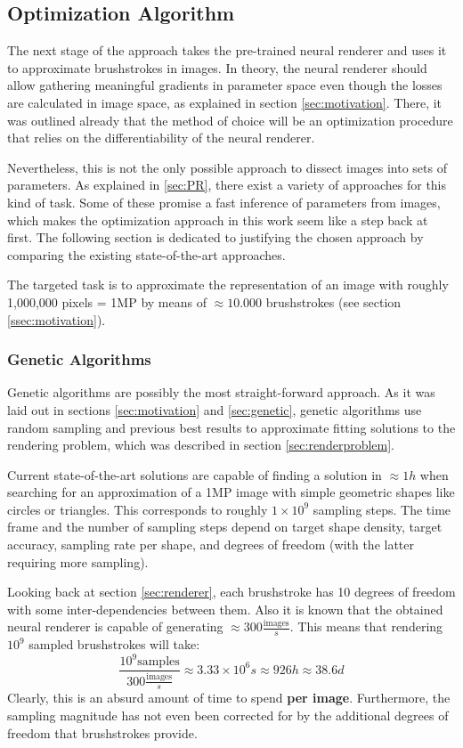 \subsection{Optimization Algorithm}
The next stage of the approach takes the pre-trained neural renderer and uses it to approximate brushstrokes in images.
In theory, the neural renderer should allow gathering meaningful gradients in parameter space even though the losses are calculated in image space, as explained in section
\ref{sec:motivation}.
There, it was outlined already that the method of choice will be an optimization procedure that relies on the differentiability of the neural renderer.

Nevertheless, this is not the only possible approach to dissect images into sets of parameters.
As explained in \ref{sec:PR}, there exist a variety of approaches for this kind of task.
Some of these promise a fast inference of parameters from images, which makes the optimization approach in this work seem like a step back at first.
The following section is dedicated to justifying the chosen approach by comparing the existing state-of-the-art approaches.

The targeted task is to approximate the representation of an image with roughly 1,000,000 pixels = 1MP by means of $\approx 10.000$ brushstrokes (see section \ref{ssec:motivation}).

\subsubsection{Genetic Algorithms}
Genetic algorithms are possibly the most straight-forward approach.
As it was laid out in sections \ref{sec:motivation} and \ref{sec:genetic}, genetic algorithms use random sampling and previous best results to approximate fitting solutions to the rendering problem, which was described in section \ref{sec:renderproblem}.

Current state-of-the-art solutions are capable of finding a solution in $\approx 1h$ when searching for an approximation of a 1MP image with simple geometric shapes like circles or triangles.
This corresponds to roughly $1 \times 10^{9}$ sampling steps.
The time frame and the number of sampling steps depend on target shape density, target accuracy, sampling rate per shape, and degrees of freedom (with the latter requiring more sampling).

Looking back at section \ref{sec:renderer}, each brushstroke has 10 degrees of freedom with some inter-dependencies between them.
Also it is known that the obtained neural renderer is capable of generating $\approx 300 \frac{\text{images}}{s}$.
This means that rendering $10^{9}$ sampled brushstrokes will take:
$$
\frac{10^{9} \text{samples}}{300 \frac{\text{images}}{s}} \approx 3.33 \times 10^{6} s
\approx 926 h \approx 38.6 d
$$
Clearly, this is an absurd amount of time to spend \textbf{per image}.
Furthermore, the sampling magnitude has not even been corrected for by the additional degrees of freedom that brushstrokes provide.

